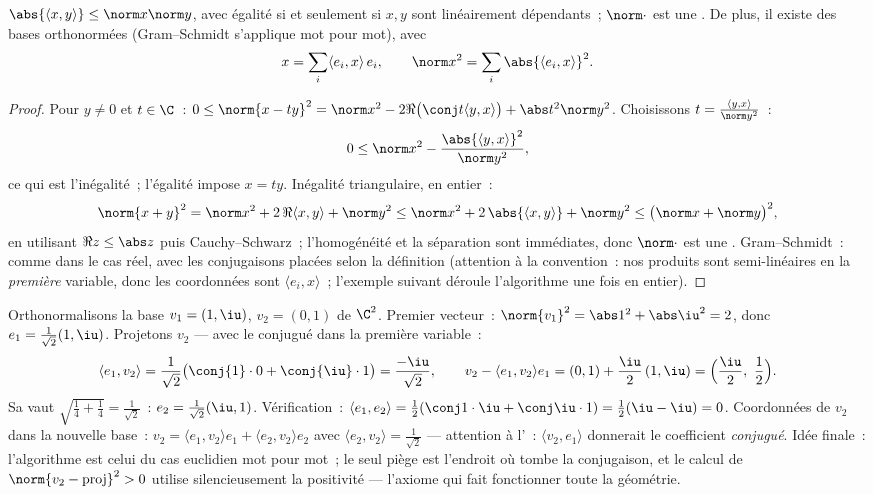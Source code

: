 \begin{theorem}\label{thm:b2:hermitian:cs}
$\abs{\langle x, y\rangle} \leq \norm x \norm y$, avec égalité si et
seulement si $x, y$ sont linéairement dépendants~; $\norm\cdot$ est une
. De plus, il existe des bases orthonormées (Gram--Schmidt
s'applique mot pour mot), avec
\[
x = \sum_i \langle e_i, x\rangle\, e_i,
\qquad
\norm x^2 = \sum_i \abs{\langle e_i, x\rangle}^2 .
\]
\end{theorem}

\begin{proof}
Pour $y \neq 0$ et $t \in \C$~: $0 \leq \norm{x - ty}^2 = \norm x^2
- 2\Re\bigl(\conj t\langle y, x\rangle\bigr) + \abs t^2\norm y^2$.
Choisissons $t = \frac{\langle y, x\rangle}{\norm y^2}$~:
\[
0 \leq \norm x^2 - \frac{\abs{\langle y, x\rangle}^2}{\norm y^2},
\]
ce qui est l'inégalité~; l'égalité impose $x = ty$. Inégalité
triangulaire, en entier~:
\[
\norm{x + y}^2 = \norm x^2 + 2\,\Re\langle x, y\rangle
+ \norm y^2
\leq \norm x^2 + 2\,\abs{\langle x, y\rangle} + \norm y^2
\leq \bigl(\norm x + \norm y\bigr)^2 ,
\]
en utilisant $\Re z \leq \abs z$ puis Cauchy--Schwarz~;
l'homogénéité et la séparation sont immédiates, donc $\norm\cdot$ est
une . Gram--Schmidt~: comme dans le cas réel, avec les
conjugaisons placées selon la définition (attention à la
convention~: nos produits sont semi-linéaires en la \emph{première}
variable, donc les coordonnées sont $\langle e_i, x\rangle$~;
l'exemple suivant déroule l'algorithme une fois en entier).
\end{proof}

\begin{example}\label{ex:b2:hermitian:gramschmidt}
Orthonormalisons la base $v_1 = (1, \iu)$, $v_2 = (0, 1)$ de
$\C^2$. Premier vecteur~: $\norm{v_1}^2 = \abs1^2 + \abs\iu^2 = 2$,
donc $e_1 = \frac{1}{\sqrt2}(1, \iu)$. Projetons $v_2$ --- avec le
conjugué dans la première variable~:
\[
\langle e_1, v_2\rangle
= \frac{1}{\sqrt2}\bigl(\conj{1}\cdot0 +
\conj{\iu}\cdot1\bigr)
= \frac{-\iu}{\sqrt2} ,
\qquad
v_2 - \langle e_1, v_2\rangle e_1
= (0,1) + \frac{\iu}{2}\,(1, \iu)
= \Bigl(\frac\iu2,\ \frac12\Bigr) .
\]
Sa  vaut $\sqrt{\frac14 + \frac14} = \frac{1}{\sqrt2}$~:
$e_2 = \frac{1}{\sqrt2}(\iu, 1)$. Vérification~: $\langle e_1,
e_2\rangle = \frac12(\conj1\cdot\iu + \conj\iu\cdot1) =
\frac12(\iu - \iu) = 0$. Coordonnées de $v_2$ dans la nouvelle base~:
$v_2 = \langle e_1, v_2\rangle e_1 + \langle e_2, v_2\rangle
e_2$ avec $\langle e_2, v_2\rangle = \frac{1}{\sqrt2}$ ---
attention à l'~: $\langle v_2, e_1\rangle$ donnerait le
coefficient \emph{conjugué}. Idée finale~: l'algorithme est
celui du cas euclidien mot pour mot~; le seul piège est l'endroit
où tombe la conjugaison, et le calcul de $\norm{v_2 -
\text{proj}}^2 > 0$ utilise silencieusement la positivité --- l'axiome
qui fait fonctionner toute la géométrie.
\end{example}

